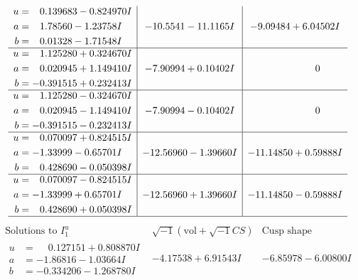 \documentclass[1p]{elsarticle_modified}
\theoremstyle{definition}
\newcommand{\I}{\sqrt{-1}}
\begin{document}
$$\begin{array}{c|c|c}
\begin{aligned}
u &= \phantom{-}0.139683 - 0.824970 I \\
a &= \phantom{-}1.78560 - 1.23758 I \\
b &= \phantom{-}0.01328 - 1.71548 I\end{aligned}
 & -10.5541 - 11.1165 I & -9.09484 + 6.04502 I \\ \hline\begin{aligned}
u &= \phantom{-}1.125280 + 0.324670 I \\
a &= \phantom{-}0.020945 + 1.149410 I \\
b &= -0.391515 + 0.232413 I\end{aligned}
 & -7.90994 + 0.10402 I & \phantom{-0.000000 } 0 \\ \hline\begin{aligned}
u &= \phantom{-}1.125280 - 0.324670 I \\
a &= \phantom{-}0.020945 - 1.149410 I \\
b &= -0.391515 - 0.232413 I\end{aligned}
 & -7.90994 - 0.10402 I & \phantom{-0.000000 } 0 \\ \hline\begin{aligned}
u &= \phantom{-}0.070097 + 0.824515 I \\
a &= -1.33999 - 0.65701 I \\
b &= \phantom{-}0.428690 - 0.050398 I\end{aligned}
 & -12.56960 - 1.39660 I & -11.14850 + 0.59888 I \\ \hline\begin{aligned}
u &= \phantom{-}0.070097 - 0.824515 I \\
a &= -1.33999 + 0.65701 I \\
b &= \phantom{-}0.428690 + 0.050398 I\end{aligned}
 & -12.56960 + 1.39660 I & -11.14850 - 0.59888 I\\
 \hline 
 \end{array}$$\newpage$$\begin{array}{c|c|c}  
\text{Solutions to }I^u_{1}& \I (\text{vol} + \sqrt{-1}CS) & \text{Cusp shape}\\
 \hline 
\begin{aligned}
u &= \phantom{-}0.127151 + 0.808870 I \\
a &= -1.86816 - 1.03664 I \\
b &= -0.334206 - 1.268780 I\end{aligned}
 & -4.17538 + 6.91543 I & -6.85978 - 6.00800 I \\ \hline\begin{aligned}

\end{aligned}
\end{array}$$
\end{document}
